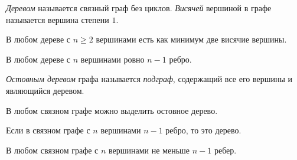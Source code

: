 \resetproblem \begingroup %
    \def\jeolmdate{9 ноября 2018 г.}%
    \def\jeolmauthors{Орлов~О.\,П.}%
\jeolmheader \endgroup


 \textit{Деревом} называется связный граф без циклов. \textit{Висячей} вершиной в графе называется вершина степени $1$.

 В любом дереве с $n \geqslant 2$ вершинами есть как минимум две висячие вершины.

 В любом дереве с $n$ вершинами ровно $n-1$ ребро.

 \textit{Остовным деревом} графа называется \textit{подграф}, содержащий все его вершины и являющийся деревом.

 В любом связном графе можно выделить остовное дерево.

 Если в связном графе с $n$ вершинами $n-1$ ребро, то это дерево.

 В любом связном графе с $n$ вершинами не меньше $n-1$ ребер.

